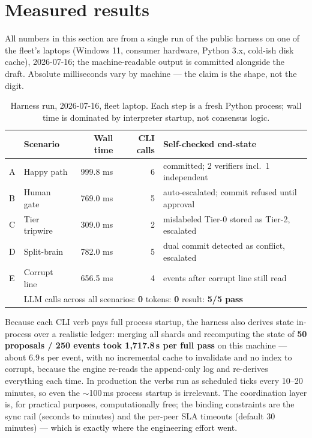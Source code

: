 \documentclass[11pt]{article}
\begin{document}
\section{Measured results}\label{sec:eval}
All numbers in this section are from a single run of the public harness on one of the fleet's laptops (Windows 11, consumer hardware, Python 3.x, cold-ish disk cache), 2026-07-16; the machine-readable output is committed alongside the draft. Absolute milliseconds vary by machine --- the claim is the shape, not the digit.

\begin{table}[h]
\centering
\small
\begin{tabular}{llrrl}
\toprule
 & Scenario & Wall time & CLI calls & Self-checked end-state \\
\midrule
A & Happy path & 999.8 ms & 6 & committed; 2 verifiers incl.\ 1 independent \\
B & Human gate & 769.0 ms & 5 & auto-escalated; commit refused until approval \\
C & Tier tripwire & 309.0 ms & 2 & mislabeled Tier-0 stored as Tier-2, escalated \\
D & Split-brain & 782.0 ms & 5 & dual commit detected as conflict, escalated \\
E & Corrupt line & 656.5 ms & 4 & events after corrupt line still read \\
\midrule
 & \multicolumn{4}{l}{LLM calls across all scenarios: \textbf{0} \qquad tokens: \textbf{0} \qquad result: \textbf{5/5 pass}} \\
\bottomrule
\end{tabular}
\caption{Harness run, 2026-07-16, fleet laptop. Each step is a fresh Python process; wall time is dominated by interpreter startup, not consensus logic.}
\label{tab:scenarios}
\end{table}

Because each CLI verb pays full process startup, the harness also derives state in-process over a realistic ledger: merging all shards and recomputing the state of \textbf{50 proposals / 250 events took 1{,}717.8\,\textmu s per full pass} on this machine --- about 6.9\,\textmu s per event, with no incremental cache to invalidate and no index to corrupt, because the engine re-reads the append-only log and re-derives everything each time. In production the verbs run as scheduled ticks every 10--20 minutes, so even the $\sim$100\,ms process startup is irrelevant. The coordination layer is, for practical purposes, computationally free; the binding constraints are the sync rail (seconds to minutes) and the per-peer SLA timeouts (default 30 minutes) --- which is exactly where the engineering effort went.
\end{document}
